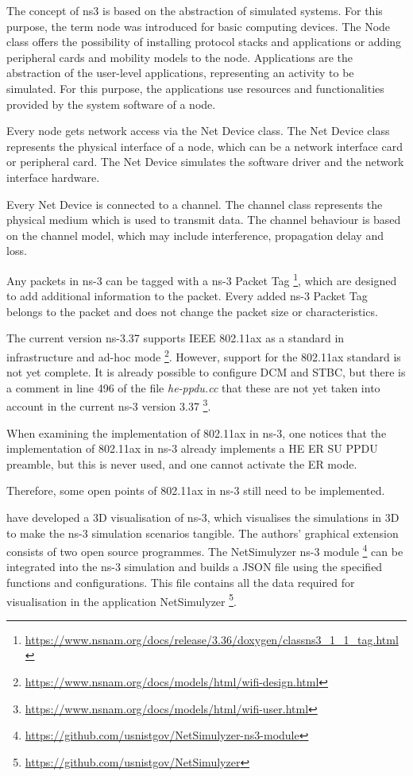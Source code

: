 The concept of ns3 is based on the abstraction of simulated systems.
For this purpose, the term node was introduced for basic computing devices.
The Node class offers the possibility of installing protocol stacks and applications or adding peripheral cards and mobility models to the node.
Applications are the abstraction of the user-level applications, representing an activity to be simulated.
For this purpose, the applications use resources and functionalities provided by the system software of a node.

Every node gets network access via the Net Device class.
The Net Device class represents the physical interface of a node,
which can be a network interface card or peripheral card.
The Net Device simulates the software driver and the network interface hardware.

Every Net Device is connected to a channel.
The channel class represents the physical medium which is used to transmit data.
The channel behaviour is based
on the channel model, which may include interference, propagation delay and loss.

Any packets in ns-3 can be tagged with a ns-3 Packet Tag \footnote{\url{https://www.nsnam.org/docs/release/3.36/doxygen/classns3_1_1_tag.html}},
which are designed to add additional information to the packet.
Every added ns-3 Packet Tag belongs to the packet and does not change the packet size or characteristics.

The current version ns-3.37 supports IEEE 802.11ax as a standard in infrastructure and ad-hoc mode \footnote{\url{https://www.nsnam.org/docs/models/html/wifi-design.html}}.
However, support for the 802.11ax standard is not yet complete.
It is already possible to configure \ac{DCM} and \ac{STBC},
but there is a comment in line 496 of the file \textit{he-ppdu.cc} that these are
not yet taken into account in the current ns-3 version 3.37 \footnote{\url{https://www.nsnam.org/docs/models/html/wifi-user.html}}.

When examining the implementation of 802.11ax in ns-3, one notices that the implementation of 802.11ax
in ns-3 already implements a \ac{HE} \ac{ER} SU \ac{PPDU} preamble, but this is never used,
and one cannot activate the \ac{ER} mode.

Therefore, some open points of 802.11ax in ns-3 still need to be implemented.

\textcite{black_netsimulyzer_2021} have developed a 3D visualisation of ns-3, which visualises the simulations in 3D to make the ns-3 simulation
scenarios tangible.
The authors' graphical extension consists of two open source programmes.
The NetSimulyzer ns-3 module \footnote{\url{https://github.com/usnistgov/NetSimulyzer-ns3-module}} can be integrated into the ns-3 simulation and builds a JSON file using the specified functions and configurations.
This file contains all the data required for visualisation in the application NetSimulyzer \footnote{\url{https://github.com/usnistgov/NetSimulyzer}}.

